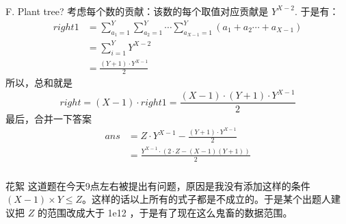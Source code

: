 \begin{frame}\frametitle{\problemname}
	
	\begin{block}{F. Plant tree?}
		{
			\small
		考虑每个数的贡献：该数的每个取值对应贡献是 $Y^{X-2}$.
		于是有：
		{
			\tiny
		$$
		\begin{aligned}
		right1&=\sum_{a_1=1}^Y\sum_{a_2=1}^Y\cdots\sum_{a_{X-1}=1}^Y(a_1+a_2\cdots+a_{X-1})\\
		&=\sum_{i=1}^Y Y^{X-2}\\
		&=\frac{(Y+1)\cdot Y^{X-1}}{2}
		\end{aligned}
		$$
		}
		所以，总和就是
		{
			\tiny
		$$
		right=(X-1)\cdot right1=\frac{(X-1)\cdot(Y+1)\cdot Y^{X-1}}{2}
		$$
		}
		最后，合并一下答案
		{
			\tiny
		$$
		\begin{aligned}
		ans&=Z\cdot Y^{X-1}-\frac{(Y+1)\cdot Y^{X-1}}{2}\\
		&=\frac{Y^{X-1}\cdot(2\cdot Z-(X-1)(Y+1)) }{2}
		\end{aligned}
		$$	
		}
		}
	\end{block}

\end{frame}
\begin{frame}\frametitle{\problemname}
\begin{block}{花絮}
		这道题在今天9点左右被提出有问题，原因是我没有添加这样的条件 $(X-1)\times Y \le Z$。这样的话以上所有的式子都是不成立的。于是某个出题人建议把 $Z$ 的范围改成大于 1e12 ，于是有了现在这么鬼畜的数据范围。
	\end{block}
		
\end{frame}



